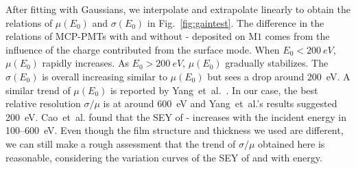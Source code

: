 After fitting with Gaussians, we interpolate and extrapolate linearly to obtain the relations of $\mu(E_0)$ and $\sigma(E_0)$ in Fig.~\ref{fig:gaintest}.
The difference in the relations of MCP-PMTs with and without - deposited on $\mathrm{M}1$ comes from the influence of the charge contributed from the surface mode.
When \(E_0 < \SI{200}{eV}\), \(\mu(E_0)\) rapidly increases.
As \(E_0 > \SI{200}{eV}\), \(\mu(E_0)\) gradually stabilizes.
The $\sigma(E_0)$ is overall increasing similar to $\mu(E_0)$ but sees a drop around \SI{200}{eV}.
A similar trend of \(\mu(E_0)\) is reported by Yang~et~al.~\cite{2017MCP}.
In our case, the best relative resolution \(\sigma/\mu\) is at around \SI{600}{eV} and
Yang~et~al.'s results suggested \SI{200}{eV}.
Cao~et~al.\cite{cao_secondary_2021} found that the SEY of -
increases with the incident energy in 100--\SI{600}{eV}.
Even though the film structure and thickness we used are different,
we can still make a rough assessment that
the trend of $\sigma/\mu$ obtained here is reasonable,
considering the variation curves of the SEY of  and  with energy.

